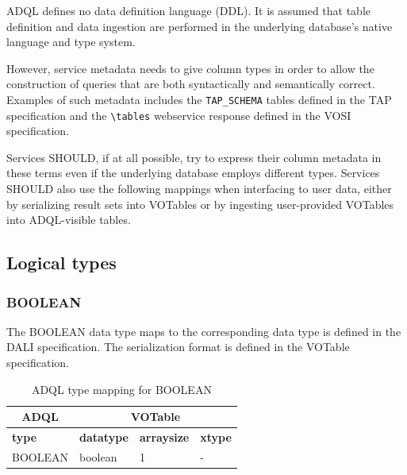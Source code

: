 \documentclass[11pt,a4paper]{ivoa}
\newcommand{\VOTspec}  {VOTable specification\xspace}
\newcommand{\TAPspec}  {TAP specification\xspace}
\newcommand{\DALIspec} {DALI specification\xspace}
\newcommand{\VOSIspec} {VOSI specification\xspace}
\begin{document}
ADQL defines no data definition language (DDL).
It is assumed that table definition and data ingestion are performed in
the underlying database's native language and type system.

However, service metadata needs to give column types in order to allow the
construction of queries that are both syntactically and semantically correct.
Examples of such metadata includes the \verb:TAP_SCHEMA: tables defined
in the \TAPspec and the \verb:\tables:
webservice response defined in the \VOSIspec.

Services SHOULD, if at all possible, try to express their column metadata in
these terms even if the underlying database employs different types.
Services SHOULD also use the following mappings when interfacing to user data,
either by serializing result sets into VOTables or by ingesting user-provided
VOTables into ADQL-visible tables.

\subsection{Logical types}
\label{sec:types.logical}
\subsubsection{BOOLEAN}
\label{sec:types.logical.boolean}

The BOOLEAN data type maps to the corresponding data type is defined in the \DALIspec.
The serialization format is defined in the \VOTspec.

\begin{table}[thm]\footnotesize
    \begin{tabular}
        {|p{}|p{}|p{}|p{}|}
        \hline

        \hline
        \multicolumn{1}{|c|}{\textbf{ADQL}} &
        \multicolumn{3}{|c|}{\textbf{VOTable}}
        \tabularnewline
        
        \hline
        \textbf{type} &
        \textbf{datatype} &
        \textbf{arraysize} &
        \textbf{xtype}
        \tabularnewline

        \hline
        BOOLEAN &
        boolean &
        1 &
        -
        \tabularnewline

        \hline
    \end{tabular}
    \caption{ADQL type mapping for BOOLEAN}
    \label{table:types.logical.boolean}
\end{table}
\end{document}

